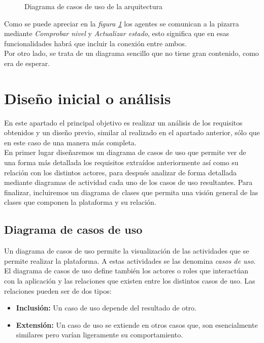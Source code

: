 \begin{figure}[H]
\centering
\casosdeuso\label{casodeuso1}
\caption{Diagrama de casos de uso de la arquitectura}
\end{figure}

Como se puede apreciar en la \emph{figura \ref{casodeuso1}} los agentes se comunican a la pizarra mediante \emph{Comprobar nivel} y \emph{Actualizar estado}, esto significa que en esas funcionalidades habrá que incluir la conexión entre ambos.\\

Por otro lado, se trata de un diagrama sencillo que no tiene gran contenido, como era de esperar.

\section{Diseño inicial o análisis}
En este apartado el principal objetivo es realizar un análisis de los requisitos obtenidos y un diseño previo, similar al realizado en el apartado anterior, sólo que en este caso de una manera más completa.\\

En primer lugar diseñaremos un diagrama de casos de uso que permite ver de una forma más detallada los requisitos extraídos anteriormente así como su relación con los distintos actores, para después analizar de forma detallada mediante diagramas de actividad cada uno de los casos de uso resultantes. Para finalizar, incluiremos un diagrama de clases que permita una visión general de las clases que componen la plataforma y su relación.\\


\subsection{Diagrama de casos de uso}\label{casosdeuso}
Un diagrama de casos de uso permite la visualización de las actividades que se permite realizar la plataforma. A estas actividades se las denomina \textit{casos de uso}. El diagrama de casos de uso define también los actores o roles que interactúan con la aplicación y las relaciones que existen entre los distintos casos de uso. Las relaciones pueden ser de dos tipos:

\begin{itemize}
	\item \textbf{Inclusión:} Un caso de uso depende del resultado de otro.
	\item \textbf{Extensión:} Un caso de uso se extiende en otros casos que, son esencialmente similares pero varían ligeramente su comportamiento.
\end{itemize}

